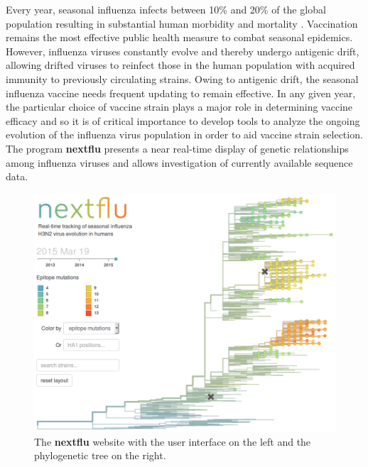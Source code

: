 \documentclass{bioinfo}
\newcommand{\nextflu}{\textbf{nextflu}}
\begin{document}

Every year, seasonal influenza infects between 10\% and 20\% of the global population resulting in substantial human morbidity and mortality \citep{flufactsheet}.
Vaccination remains the most effective public health measure to combat seasonal epidemics.
However, influenza viruses constantly evolve and thereby undergo antigenic drift, allowing drifted viruses to reinfect those in the human population with acquired immunity to previously circulating strains.
Owing to antigenic drift, the seasonal influenza vaccine needs frequent updating to remain effective.
In any given year, the particular choice of vaccine strain plays a major role in determining vaccine efficacy and so it is of critical importance to develop tools to analyze the ongoing evolution of the influenza virus population in order to aid vaccine strain selection.
The program \nextflu{} presents a near real-time display of genetic relationships among influenza viruses and allows investigation of currently available sequence data.

\begin{figure}[t!]
	\begin{center}
	\includegraphics[width=0.99\columnwidth]{figures/tree}
\caption[]{The \nextflu{} website with the user interface on the left and
the phylogenetic tree on the right.}
\label{fig:tree}
\end{center}
\end{figure}
\end{document}
